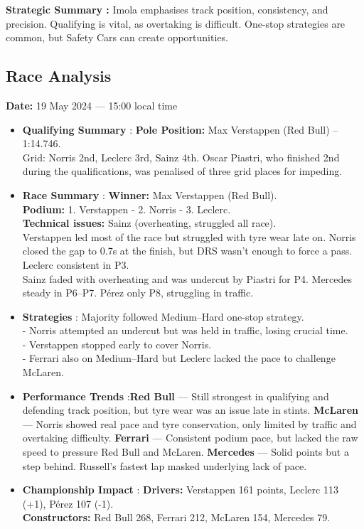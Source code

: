 \textbf{Strategic Summary :}
Imola emphasises track position, consistency, and precision. Qualifying is vital, as overtaking is difficult. One-stop strategies are common, but Safety Cars can create opportunities.


\subsection{Race Analysis}

\textbf{Date:} 19 May 2024 — 15:00 local time 

\begin{itemize}
    \item \textbf{Qualifying Summary} : \textbf{Pole Position:} Max Verstappen (Red Bull) – 1:14.746. \\
    Grid: Norris 2nd, Leclerc 3rd, Sainz 4th.
    Oscar Piastri, who finished 2nd during the qualifications, was penalised of three grid places for impeding.
    
    \item \textbf{Race Summary} : \textbf{Winner:} Max Verstappen (Red Bull).\\
    \textbf{Podium:} 1. Verstappen - 2. Norris - 3. Leclerc.\\
    \textbf{Technical issues:} Sainz (overheating, struggled all race).\\
    Verstappen led most of the race but struggled with tyre wear late on. Norris closed the gap to 0.7s at the finish, but DRS wasn’t enough to force a pass. Leclerc consistent in P3. \\
    Sainz faded with overheating and was undercut by Piastri for P4. Mercedes steady in P6–P7. Pérez only P8, struggling in traffic.
    
    \item \textbf{Strategies} : Majority followed Medium–Hard one-stop strategy.\\
    - Norris attempted an undercut but was held in traffic, losing crucial time. \\
    - Verstappen stopped early to cover Norris.\\
    - Ferrari also on Medium–Hard but Leclerc lacked the pace to challenge McLaren.
    
    \item \textbf{Performance Trends} :\textbf{Red Bull} — Still strongest in qualifying and defending track position, but tyre wear was an issue late in stints. 
    \textbf{McLaren} — Norris showed real pace and tyre conservation, only limited by traffic and overtaking difficulty. 
    \textbf{Ferrari} — Consistent podium pace, but lacked the raw speed to pressure Red Bull and McLaren. 
    \textbf{Mercedes} — Solid points but a step behind. Russell’s fastest lap masked underlying lack of pace.
    
    \item \textbf{Championship Impact} : \textbf{Drivers:} Verstappen 161 points, Leclerc 113 (+1), Pérez 107 (-1).\\
    \textbf{Constructors:} Red Bull 268, Ferrari 212, McLaren 154, Mercedes 79.    
\end{itemize}

